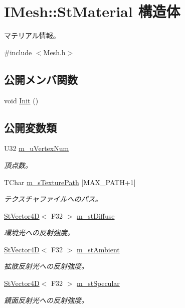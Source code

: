 \hypertarget{struct_i_mesh_1_1_st_material}{}\section{I\+Mesh\+:\+:St\+Material 構造体}
\label{struct_i_mesh_1_1_st_material}


マテリアル情報。  




{\ttfamily \#include $<$Mesh.\+h$>$}

\subsection*{公開メンバ関数}
\begin{DoxyCompactItemize}
\item 
void \hyperlink{struct_i_mesh_1_1_st_material_a0fa4b4f394fc86bfc77e8a542db857ac}{Init} ()
\end{DoxyCompactItemize}
\subsection*{公開変数類}
\begin{DoxyCompactItemize}
\item 
U32 \hyperlink{struct_i_mesh_1_1_st_material_a598e3d92e14d215a824170967fea80fa}{m\+\_\+u\+Vertex\+Num}
\begin{DoxyCompactList}\small\item\em 頂点数。 \end{DoxyCompactList}\item 
T\+Char \hyperlink{struct_i_mesh_1_1_st_material_a40c21c7fdb6c4f38bd0a5e8d353d3699}{m\+\_\+s\+Texture\+Path} \mbox{[}M\+A\+X\+\_\+\+P\+A\+T\+H+1\mbox{]}
\begin{DoxyCompactList}\small\item\em テクスチャファイルへのパス。 \end{DoxyCompactList}\item 
\hyperlink{struct_st_vector4_d}{St\+Vector4\+D}$<$ F32 $>$ \hyperlink{struct_i_mesh_1_1_st_material_a029b547c2f7dc5a0de49be288b612dff}{m\+\_\+st\+Diffuse}
\begin{DoxyCompactList}\small\item\em 環境光への反射強度。 \end{DoxyCompactList}\item 
\hyperlink{struct_st_vector4_d}{St\+Vector4\+D}$<$ F32 $>$ \hyperlink{struct_i_mesh_1_1_st_material_a64f8478229618e185affc8c2e799a33d}{m\+\_\+st\+Ambient}
\begin{DoxyCompactList}\small\item\em 拡散反射光への反射強度。 \end{DoxyCompactList}\item 
\hyperlink{struct_st_vector4_d}{St\+Vector4\+D}$<$ F32 $>$ \hyperlink{struct_i_mesh_1_1_st_material_a54867cbd373e8c442ec828ec2da8f941}{m\+\_\+st\+Specular}
\begin{DoxyCompactList}\small\item\em 鏡面反射光への反射強度。 \end{DoxyCompactList}\end{DoxyCompactItemize}


